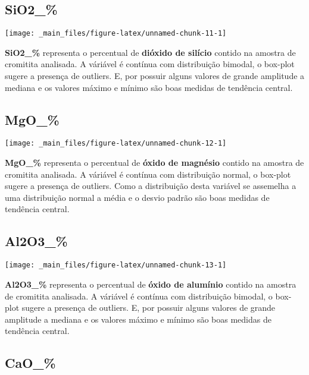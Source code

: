 \documentclass[
]{article}
\begin{document}
\hypertarget{sio2_}{%
\subsection{SiO2\_\%}\label{sio2_}}

\begin{center}\texttt{[image: \_main\_files/figure-latex/unnamed-chunk-11-1]} \end{center}

\textbf{SiO2\_\%} representa o percentual de \textbf{dióxido de silício} contido na amostra de cromitita analisada. A váriável é contínua com distribuição bimodal, o box-plot sugere a presença de outliers. E, por possuir alguns valores de grande amplitude a mediana e os valores máximo e mínimo são boas medidas de tendência central.

\hypertarget{mgo_}{%
\subsection{MgO\_\%}\label{mgo_}}

\begin{center}\texttt{[image: \_main\_files/figure-latex/unnamed-chunk-12-1]} \end{center}

\textbf{MgO\_\%} representa o percentual de \textbf{óxido de magnésio} contido na amostra de cromitita analisada. A váriável é contínua com distribuição normal, o box-plot sugere a presença de outliers. Como a distribuição desta variável se assemelha a uma distribuição normal a média e o desvio padrão são boas medidas de tendência central.

\hypertarget{al2o3_}{%
\subsection{Al2O3\_\%}\label{al2o3_}}

\begin{center}\texttt{[image: \_main\_files/figure-latex/unnamed-chunk-13-1]} \end{center}

\textbf{Al2O3\_\%} representa o percentual de \textbf{óxido de alumínio} contido na amostra de cromitita analisada. A váriável é contínua com distribuição bimodal, o box-plot sugere a presença de outliers. E, por possuir alguns valores de grande amplitude a mediana e os valores máximo e mínimo são boas medidas de tendência central.

\hypertarget{cao_}{%
\subsection{CaO\_\%}\label{cao_}}
\end{document}
